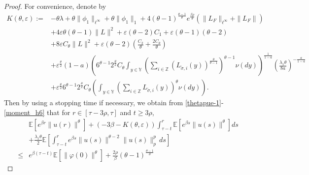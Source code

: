\documentclass[11pt]{article}
\numberwithin{equation}{section}
\theoremstyle{plain}
\begin{document}
\begin{proof}
 For convenience,  denote  by 
 \begin{align}\label{K-theta-eps}
	K(\theta,\varepsilon)
	:= & - \theta \lambda
	         + \theta \|\phi_1\|_{\ell^\infty}
	         + \theta \|\phi_1\|_{1}
	         + 4(\theta-1)^{\frac{\theta - 1}{\theta} } e^{\frac{\beta \rho}{\theta} }
	          	 \left( \|L_{F}\|_{\ell^\infty} + \|L_F\|
	          	 \right)   \nonumber\\
	& + 4 \varepsilon  \theta(\theta-1)\|L\|^2
	+ \varepsilon (\theta-2)
	 C_1
	+ \varepsilon (\theta-1)(\theta-2)                            \nonumber\\
	& + 8 \varepsilon C_{\theta} \|L\|^2
	+ \varepsilon (\theta-2)
	\left(
	\frac{C_2}
	 {\theta}
	+ \frac{2 C_{\theta}}{\theta}
	\right)                                                 \nonumber\\
	& + \varepsilon^{\frac{\theta}{2}} (1-a)
	\left(
	6^{\theta-1} 2^{\frac{\theta}{2}} C_{\theta}
  \int_{
  y\in \mathbb{Y}
  }
	\left(
	\sum_{i \in \mathbb{Z}}
	(L_{\tilde{\sigma},i}(y))^{\frac{\theta}{\theta-1}}
	\right)^{\theta-1}
	\nu(dy)
	\right)^{\frac{1}{1-a}}
	\left(
	\frac{\lambda_1 \theta}{8 a}
	\right)^{-\frac{a}{1-a}}                                   \nonumber\\
	& + \varepsilon^{\frac{\theta}{2}}
	6^{\theta-1} 2^{\frac{\theta}{2}} C_{\theta}
	\left(
	  \int_{ y\in \mathbb{Y}
	  }
	\left(
	\sum_{i \in \mathbb{Z}} L_{\tilde{\sigma},i}(y)
	\right)^{\theta}
	\nu(dy)
	\right).
 \end{align}
 Then by using a  stopping time if necessary,
 we obtain from \eqref{thetapue-1}-\eqref{moment_h6}  that 
 for $r \in [\tau - { 3} \rho, \tau]$ and $t \ge { 3} \rho$,
 \begin{align}\label{3.12_4}
 	   & \mathbb{E}
 	              \left[ e^{\beta r} \|u(r)\|^{\theta} \right]
 	       + \left( -3\beta - K(\theta,\varepsilon) \right)
              \int_{\tau-t}^{r}
 	              \mathbb{E}
 	                     \left[ e^{\beta s} \|u(s)\|^{\theta}
 	                     \right] ds  \nonumber\\
 	   & + \frac{\lambda_1 \theta}{2}
 	               \mathbb{E}
 	                     \left[ \int_{\tau-t}^{r}
 	                                  e^{\beta s}
                    	              \|u(s)\|^{\theta-2} \|u(s)\|_p^{p} \, ds
 	                     \right]  \nonumber\\
\le & e^{\beta (\tau-t)}
 	     \mathbb{E} \left[ \|\varphi(0)\|^{\theta} \right]
 	     + \frac{2 \rho}{\beta} 
 	        (\theta - 1)^{\frac{\theta - 1}{\theta} } 

\end{align}
\end{proof}
\end{document}
